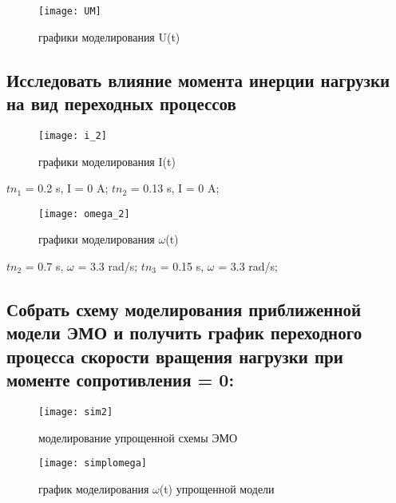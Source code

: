 \begin{figure}[H]
	\begin{center}
		\texttt{[image: UM]}
		\caption{графики моделирования U(t)} 
		\label{pic:pic_5} %
	\end{center}
\end{figure}

\subsection{Исследовать влияние момента инерции нагрузки на вид переходных процессов}

\begin{figure}[H]
	\begin{center}
		\texttt{[image: i\_2]}
		\caption{графики моделирования I(t)} 
		\label{pic:pic_2} %
	\end{center}
\end{figure}

$tn_1$ = 0.2 s, I = 0 A;
$tn_2$ = 0.13 s, I = 0 A;

\begin{figure}[H]
	\begin{center}
		\texttt{[image: omega\_2]}
		\caption{графики моделирования $\omega$(t)} 
		\label{pic:pic_4} %
	\end{center}
\end{figure}

$tn_2$ = 0.7 s, $\omega$ = 3.3 rad/s;
$tn_3$ = 0.15 s, $\omega$ = 3.3 rad/s;

\subsection{Собрать схему моделирования приближенной модели ЭМО и получить график переходного процесса скорости вращения нагрузки при моменте сопротивления = 0:}

\begin{figure}[H]
	\begin{center}
		\texttt{[image: sim2]}
		\caption{моделирование упрощенной схемы ЭМО} 
		\label{pic:pic_4} %
	\end{center}
\end{figure}

\begin{figure}[H]
	\begin{center}
		\texttt{[image: simplomega]}
		\caption{график моделирования $\omega$(t) упрощенной модели} 
		\label{pic:pic_5} %
	\end{center}
\end{figure}

